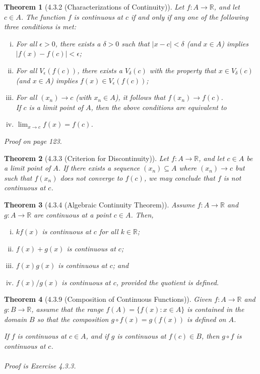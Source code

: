 \documentclass{article}
\newtheorem{theorem}{Theorem}
\begin{document}
\begin{theorem}[4.3.2 (Characterizations of Continuity)]
    Let $f:A\rightarrow \mathbb{R}$, and let $c \in A$. The function $f$ is continuous at $c$ if and only if any one of the following three conditions is met:
    \begin{enumerate}[(i)]
        \item For all $\epsilon > 0$, there exists a $\delta > 0$ such that $|x - c| < \delta$ (and $x \in A$) implies $|f(x)-f(c)|<\epsilon$;
        \item For all $V_\epsilon (f(c))$, there exists a $V_\delta (c)$ with the property that $x \in V_\delta (c)$ (and $x \in A$) implies $f(x)\in V_\epsilon (f(c))$;
        \item For all $(x_n) \rightarrow c$ (with $x_n \in A$), it follows that $f(x_n)\rightarrow f(c)$.\\
        If $c$ is a limit point of $A$, then the above conditions are equivalent to
        \item $\lim _{x \rightarrow c}f(x)=f(c)$.
    \end{enumerate}
    Proof on page 123.
\end{theorem}

\begin{theorem}[4.3.3 (Criterion for Discontinuity)]
    Let $f:A\rightarrow \mathbb{R}$, and let $c \in A$ be a limit point of $A$. If there exists a sequence $(x_n)\subseteq A$ where $(x_n)\rightarrow c$ but such that $f(x_n)$ does not converge to $f(c)$, we may conclude that $f$ is not continuous at $c$.
\end{theorem}

\begin{theorem}[4.3.4 (Algebraic Continuity Theorem)]
    Assume $f:A\rightarrow \mathbb{R}$ and $g:A\rightarrow \mathbb{R}$ are continuous at a point $c \in A$. Then,
    \begin{enumerate}[(i)]
        \item $kf(x)$ is continuous at $c$ for all $k \in \mathbb{R}$;
        \item $f(x) + g(x)$ is continuous at $c$;
        \item $f(x)g(x)$ is continuous at $c$; and
        \item $f(x)/g(x)$ is continuous at $c$, provided the quotient is defined.
    \end{enumerate}
\end{theorem}

\begin{theorem}[4.3.9 (Composition of Continuous Functions)]
    Given $f:A\rightarrow \mathbb{R}$ and $g:B\rightarrow \mathbb{R}$, assume that the range $f(A)=\{f(x):x\in A\}$ is contained in the domain $B$ so that the composition $g \circ f(x)=g(f(x))$ is defined on $A$.

    If $f$ is continuous at $c \in A$, and if $g$ is continuous at $f(c)\in B$, then $g \circ f$ is continuous at $c$.\\\\
    Proof is Exercise 4.3.3.
\end{theorem}
\end{document}
